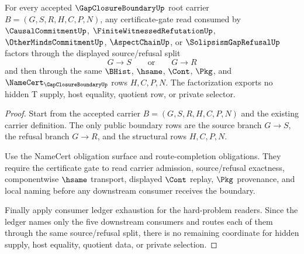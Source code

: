 \begin{theorem}
\label{thm:gap-closure-boundary-root-certificate-gate-factorization}
For every accepted $\GapClosureBoundaryUp$ root carrier $B=(G,S,R,H,C,P,N)$, any certificate-gate read consumed by $\CausalCommitmentUp$, $\FiniteWitnessedRefutationUp$, $\OtherMindsCommitmentUp$, $\AspectChainUp$, or $\SolipsismGapRefusalUp$ factors through the displayed source/refusal split
$$
G \longrightarrow S
\qquad\text{or}\qquad
G \longrightarrow R
$$
and then through the same $\BHist$, $\hsame$, $\Cont$, $\Pkg$, and $\NameCert_{\GapClosureBoundaryUp}$ rows $H,C,P,N$. The factorization exports no hidden T supply, host equality, quotient row, or private selector.
\end{theorem}
\begin{proof}
Start from the accepted carrier $B=(G,S,R,H,C,P,N)$ and the existing carrier definition. The only public boundary rows are the source branch $G \longrightarrow S$, the refusal branch $G \longrightarrow R$, and the structural rows $H,C,P,N$.

Use the NameCert obligation surface and route-completion obligations. They require the certificate gate to read carrier admission, source/refusal exactness, componentwise $\hsame$ transport, displayed $\Cont$ replay, $\Pkg$ provenance, and local naming before any downstream consumer receives the boundary.

Finally apply consumer ledger exhaustion for the hard-problem readers. Since the ledger names only the five downstream consumers and routes each of them through the same source/refusal split, there is no remaining coordinate for hidden supply, host equality, quotient data, or private selection.
\end{proof}

